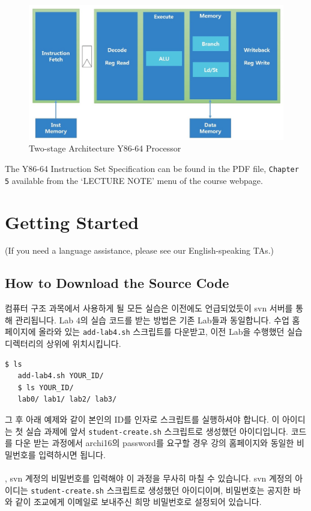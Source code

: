 \documentclass{article}
\begin{document}
\begin{figure}[htbp]
	\begin{center}
		\includegraphics[scale=0.4]{figure1.jpg}
		\caption{Two-stage Architecture Y86-64 Processor} \label{fig:lable}
	\end{center}
\end{figure}
The Y86-64 Instruction Set Specification can be found in the PDF file, \texttt{Chapter 5} available
from the ‘LECTURE NOTE’ menu of the course webpage. 

\section{Getting Started}
(If you need a language assistance, please see our English-speaking TAs.)
\subsection{How to Download the Source Code}
컴퓨터 구조 과목에서 사용하게 될 모든 실습은 이전에도 언급되었듯이 svn 서버를 통해 관리됩니다.
Lab 4의 실습 코드를 받는 방법은 기존 Lab들과 동일합니다.
수업 홈페이지에 올라와 있는 \texttt{add-lab4.sh} 스크립트를 다운받고,
이전 Lab을 수행했던 실습 디렉터리의 상위에 위치시킵니다.

\begin{Verbatim}[frame=single]
   $ ls
   add-lab4.sh YOUR_ID/
   $ ls YOUR_ID/
   lab0/ lab1/ lab2/ lab3/
\end{Verbatim}

그 후 아래 예제와 같이 본인의 ID를 인자로 스크립트를 실행하셔야 합니다.
이 아이디는 첫 실습 과제에 앞서 \texttt{student-create.sh} 스크립트로 생성했던 아이디입니다.
코드를 다운 받는 과정에서 archi16의 password를 요구할 경우 강의 홈페이지와 동일한 비밀번호를 입력하시면 됩니다.
\\\\
, svn 계정의 비밀번호를 입력해야 이 과정을 무사히 마칠 수 있습니다.
svn 계정의 아이디는 \texttt{student-create.sh} 스크립트로 생성했던 아이디이며, 
비밀번호는 공지한 바와 같이 조교에게 이메일로 보내주신 희망 비밀번호로 설정되어 있습니다.
\end{document}
